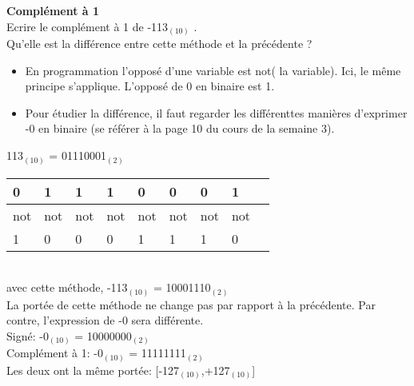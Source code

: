 \begin{Exercice}[15 minutes] \textbf{Complément à 1}\\
    Ecrire le complément à 1 de -113$_{(10)}$ . \\

	Qu'elle est la différence entre cette méthode et la précédente ? \\

    \begin{conseil}
        \begin{itemize}
        	\item En programmation l'opposé d'une variable est not( la variable). Ici, le même principe s'applique. L'opposé de 0 en binaire est 1.
        	\item Pour étudier la différence, il faut regarder les différenttes manières d'exprimer -0 en binaire (se référer à la page 10 du cours de la semaine 3).
        \end{itemize} 
    \end{conseil}
    
    \begin{solution}
    	113$_{(10)}$ = 01110001$_{(2)}$ \\
    	
        \begin{tabular}{| p{1cm} | p{1cm} | p{1cm} | p{1cm} | p{1cm} | p{1cm} | p{1cm} | p{1cm} | p{1cm} |} 
            \hline
            0 & 1 & 1 & 1 & 0 & 0 & 0 & 1 \\ [0.5ex] 
            \hline
            not & not & not & not & not & not & not & not \\ [0.5ex]
            \hline
            1 & 0 & 0 & 0 & 1 & 1 & 1 & 0 \\ [0.5ex]
            \hline
        \end{tabular} \\
        
        avec cette méthode, -113$_{(10)}$ = 10001110$_{(2)}$ \\
        
        La portée de cette méthode ne change pas par rapport à la précédente. Par contre, l'expression de -0 sera différente.\\
        
        Signé: -0$_{(10)}$ = 10000000$_{(2)}$ \\
        
        Complément à 1: -0$_{(10)}$ = 11111111$_{(2)}$ \\
        
        Les deux ont la même portée: [-127$_{(10)}$,+127$_{(10)}$] \\
        
    \end{solution}
\end{Exercice}

